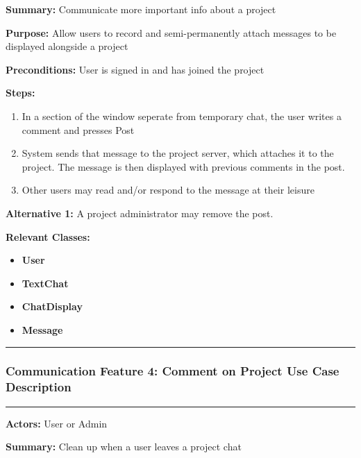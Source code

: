 \documentclass[twoside,letterpaper]{article}
\begin{document}
\noindent\textbf{Summary:} Communicate more important info about a project  \newline

\noindent\textbf{Purpose:} Allow users to record and semi-permanently attach messages to be displayed alongside a project \newline

\noindent\textbf{Preconditions:} User is signed in and has joined the project \newline

\noindent\textbf{Steps:} \begin{enumerate}
	\item In a section of the window seperate from temporary chat, the user writes a comment and presses Post
	\item System sends that message to the project server, which attaches it to the project. The message is then displayed with previous comments in the post.
	\item Other users may read and/or respond to the message at their leisure
\end{enumerate}
\noindent\textbf{Alternative 1:} A project administrator may remove the post. \newline


\noindent\textbf{Relevant Classes:}
\begin{itemize}
	\item \textbf{User}
	\item \textbf{TextChat}
	\item \textbf{ChatDisplay}
	\item \textbf{Message}
\end{itemize}
\hrule
\newpage

\subsubsection[Communication Feature 5: Close chat Use Case Description]{\rmfamily\bfseries\color{black}
	Communication Feature 4: Comment on Project Use Case Description}
\hypertarget{RefHeading22059017292}{}

\vspace{2pt}
\hrule
\vspace{8pt}
\textbf{Actors:} User or Admin \newline

\noindent\textbf{Summary:} Clean up when a user leaves a project chat \newline
\end{document}
